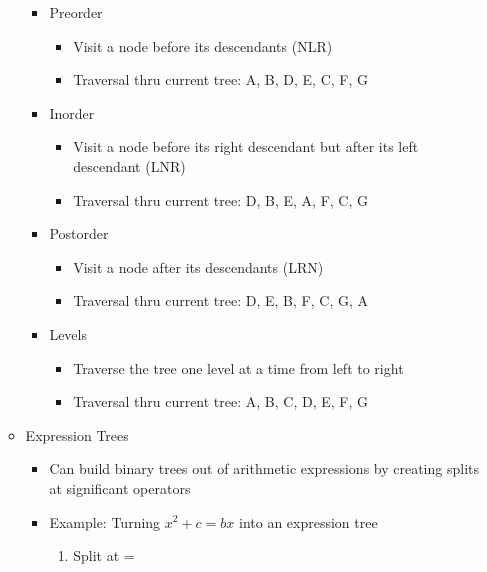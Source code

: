 \documentclass{article}
\begin{document}
\begin{itemize}
\begin{itemize}
\begin{itemize}
                    \item Preorder
                        \begin{itemize}
                            \item Visit a node before its descendants (NLR)
                            \item Traversal thru current tree: A, B, D, E, C, F, G
                        \end{itemize}
                    \item Inorder
                        \begin{itemize}
                            \item Visit a node before its right descendant but after its left descendant (LNR)
                            \item Traversal thru current tree: D, B, E, A, F, C, G
                        \end{itemize}
                    \item Postorder
                        \begin{itemize}
                            \item Visit a node after its descendants (LRN)
                            \item Traversal thru current tree: D, E, B, F, C, G, A
                        \end{itemize}
                    \item Levels
                        \begin{itemize}
                            \item Traverse the tree one level at a time from left to right
                            \item Traversal thru current tree: A, B, C, D, E, F, G
                        \end{itemize}
                \end{itemize}
            \item Expression Trees
                \begin{itemize}
                    \item Can build binary trees out of arithmetic expressions by creating splits at significant operators
                    \item Example: Turning $x^2 + c = bx$ into an expression tree
                        \begin{enumerate}
                            \item Split at =


\end{enumerate}
\end{itemize}
\end{itemize}
\end{itemize}
\end{document}
